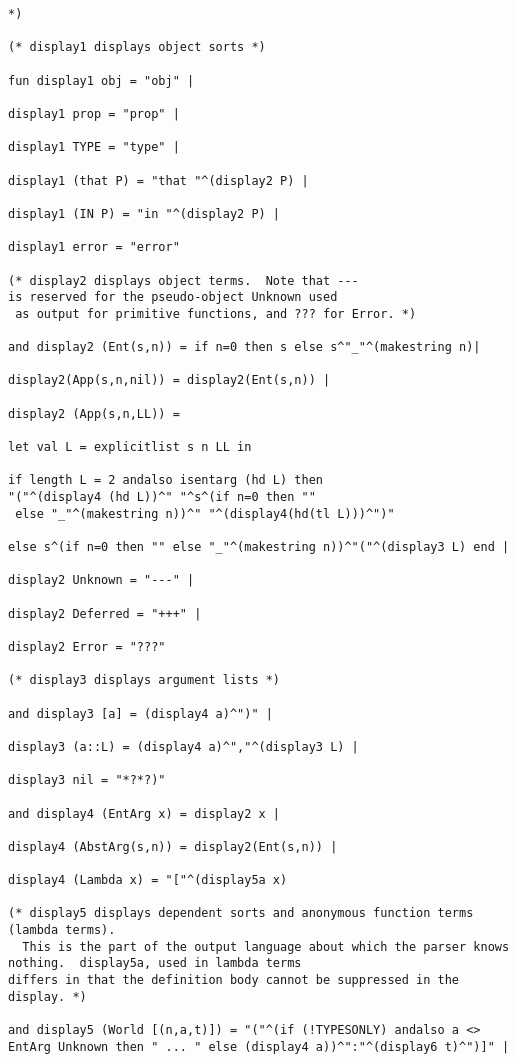 \documentclass{article}
\begin{document}
\begin{verbatim}
*)

(* display1 displays object sorts *)

fun display1 obj = "obj" |

display1 prop = "prop" |

display1 TYPE = "type" |

display1 (that P) = "that "^(display2 P) |

display1 (IN P) = "in "^(display2 P) |

display1 error = "error"

(* display2 displays object terms.  Note that --- 
is reserved for the pseudo-object Unknown used
 as output for primitive functions, and ??? for Error. *)

and display2 (Ent(s,n)) = if n=0 then s else s^"_"^(makestring n)|

display2(App(s,n,nil)) = display2(Ent(s,n)) |

display2 (App(s,n,LL)) = 

let val L = explicitlist s n LL in

if length L = 2 andalso isentarg (hd L) then 
"("^(display4 (hd L))^" "^s^(if n=0 then ""
 else "_"^(makestring n))^" "^(display4(hd(tl L)))^")"

else s^(if n=0 then "" else "_"^(makestring n))^"("^(display3 L) end |

display2 Unknown = "---" |

display2 Deferred = "+++" |

display2 Error = "???"

(* display3 displays argument lists *)

and display3 [a] = (display4 a)^")" |

display3 (a::L) = (display4 a)^","^(display3 L) |

display3 nil = "*?*?)"

and display4 (EntArg x) = display2 x |

display4 (AbstArg(s,n)) = display2(Ent(s,n)) |

display4 (Lambda x) = "["^(display5a x)

(* display5 displays dependent sorts and anonymous function terms (lambda terms).
  This is the part of the output language about which the parser knows nothing.  display5a, used in lambda terms
differs in that the definition body cannot be suppressed in the display. *)

and display5 (World [(n,a,t)]) = "("^(if (!TYPESONLY) andalso a <> EntArg Unknown then " ... " else (display4 a))^":"^(display6 t)^")]" |


\end{verbatim}
\end{document}
